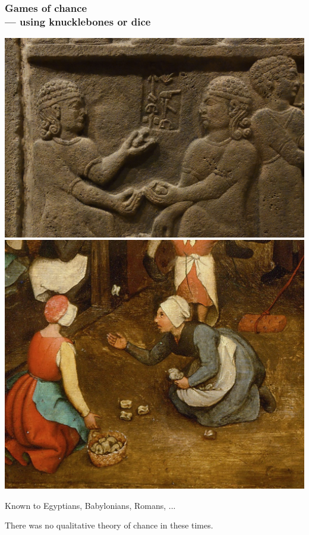 \documentclass[9pt]{beamer}
\begin{document}
\begin{frame}[fragile] %
  \frametitle{Games of chance \\ --- using knucklebones or dice}
  \begin{center}
    \includegraphics[scale=0.40]{./figs/Knucklebones2.jpg} \quad
    \includegraphics[scale=0.172]{./figs/Knucklebones.jpg}
    \bigskip

    Known to Egyptians, Babylonians, Romans, ...
  \end{center}
\end{frame}
\begin{frame}[fragile] %
 \begin{center}
   There was no qualitative theory of chance in these times.
 \end{center}
\end{frame}
\end{document}
